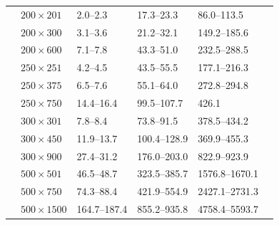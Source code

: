 \documentclass[preprint,12pt]{elsarticle}
\theoremstyle{plain}
\theoremstyle{definition}
\numberwithin{equation}{section}
\numberwithin{figure}{section}
\numberwithin{table}{section}
\begin{document}
{\begin{table}[ht]
\begin{center}
\begin{tabular}{|l|l|l|l|l|l|}
& $200 \times 201$ & 2.0--2.3 & 17.3--23.3 & 86.0--113.5\\
& $200 \times 300$ & 3.1--3.6 & 21.2--32.1 & 149.2--185.6\\
& $200 \times 600$ & 7.1--7.8 & 43.3--51.0 & 232.5--288.5\\
& $250 \times 251$ & 4.2--4.5 & 43.5--55.5 & 177.1--216.3\\
& $250 \times 375$ & 6.5--7.6 & 55.1--64.0 & 272.8--294.8\\
& $250 \times 750$ & 14.4--16.4 & 99.5--107.7 & 426.1\\  %
& $300 \times 301$ & 7.8--8.4 & 73.8--91.5 & 378.5--434.2\\
& $300 \times 450$ & 11.9--13.7 & 100.4--128.9 & 369.9--455.3\\
& $300 \times 900$ & 27.4--31.2 & 176.0--203.0 & 822.9--923.9\\
& $500 \times 501$ & 46.5--48.7 & 323.5--385.7 & 1576.8--1670.1\\
& $500 \times 750$ & 74.3--88.4 & 421.9--554.9 & 2427.1--2731.3\\
& $500 \times 1500$ & 164.7--187.4 & 855.2--935.8 & 4758.4--5593.7\\
\hline
\end{tabular}
\end{center}
\end{table}
}

\clearpage\newpage

  
\end{document}

